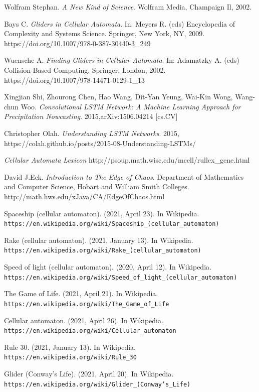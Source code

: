 \documentclass[12pt]{article}
\numberwithin{figure}{section} %
\begin{document}
\begin{thebibliography}{9}
Wolfram Stephan.
\textit{A New Kind of Science}. 
Wolfram Media, Champaign Il, 2002. 

Bays C.
\textit{Gliders in Cellular Automata}. 
In: Meyers R. (eds) Encyclopedia of Complexity and Systems Science. Springer, New York, NY, 2009.
https://doi.org/10.1007/978-0-387-30440-3\_249

Wuensche A.
\textit{Finding Gliders in Cellular Automata}. 
In: Adamatzky A. (eds) Collision-Based Computing. Springer, London, 2002. 
https://doi.org/10.1007/978-14471-0129-1\_13

Xingjian Shi, Zhourong Chen, Hao Wang, Dit-Yan Yeung, Wai-Kin Wong, Wang-chun Woo. 
\textit{Convolutional LSTM Network: A Machine Learning Approach for Precipitation Nowcasting}. 
2015,arXiv:1506.04214 [cs.CV]

Christopher Olah.
\textit{Understanding LSTM Networks}. 
2015, https://colah.github.io/posts/2015-08-Understanding-LSTMs/

\textit{Cellular Automata Lexicon}
http://psoup.math.wisc.edu/mcell/rullex\_gene.html

David J.Eck.
\textit{Introduction to The Edge of Chaos}.
Department of Mathematics and Computer Science, Hobart and William Smith Colleges. 
http://math.hws.edu/xJava/CA/EdgeOfChaos.html
 
Spaceship (cellular automaton). (2021, April 23). In Wikipedia.
\\\texttt{https://en.wikipedia.org/wiki/Spaceship\_(cellular\_automaton)}

Rake (cellular automaton). (2021, January 13). In Wikipedia.
\\\texttt{https://en.wikipedia.org/wiki/Rake\_(cellular\_automaton)}

Speed of light (cellular automaton). (2020, April 12). In Wikipedia.
\\\texttt{https://en.wikipedia.org/wiki/Speed\_of\_light\_(cellular\_automaton)}

The Game of Life. (2021, April 21). In Wikipedia. 
\\\texttt{https://en.wikipedia.org/wiki/The\_Game\_of\_Life}

Cellular automaton. (2021, April 26). In Wikipedia. 
\\\texttt{https://en.wikipedia.org/wiki/Cellular\_automaton}

Rule 30. (2021, January 13). In Wikipedia. 
\\\texttt{https://en.wikipedia.org/wiki/Rule\_30}

Glider (Conway’s Life). (2021, April 20). In Wikipedia. 
\\\texttt{https://en.wikipedia.org/wiki/Glider\_(Conway’s\_Life)}

\end{thebibliography}
\end{document}

